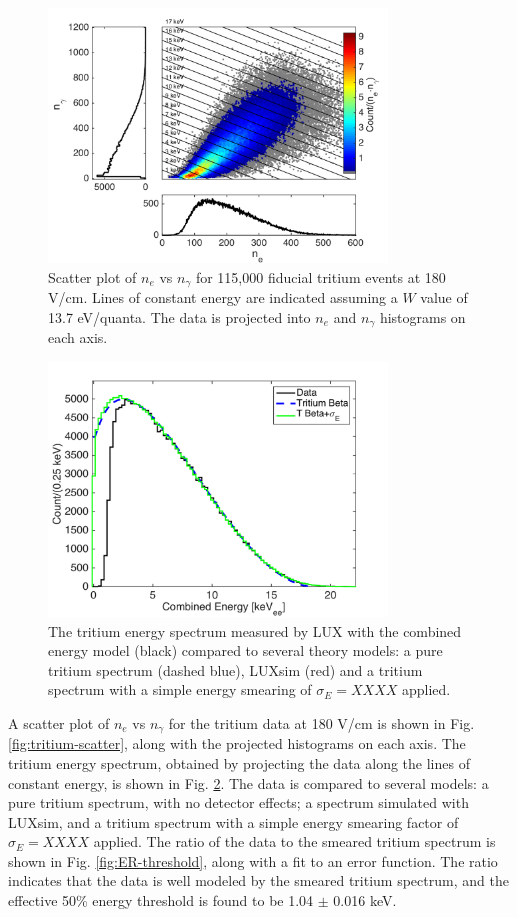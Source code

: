 \begin{figure}[h!]\centering
\includegraphics[width=90mm]{fig/tritium_scatter.png}
\caption{Scatter plot of $n_e$ vs $n_{\gamma}$ for 115,000 fiducial tritium events at 180 V/cm. Lines of constant energy are indicated assuming a $W$ value of 13.7 eV/quanta. The data is projected into $n_e$ and $n_{\gamma}$ histograms on each axis.}
\label{fig:tritium_scatter}
\end{figure}


\begin{figure}[h!]
\begin{center}
\includegraphics[width=90mm]{fig/tritium-spectrum-linear.png}
\caption{The tritium energy spectrum measured by LUX with the combined energy model (black) compared to several theory models: a pure tritium spectrum (dashed blue), LUXsim (red) and a tritium spectrum with a simple energy smearing of $\sigma_E = XXXX$ applied. }
\label{fig:tritium-spectrum}
\end{center}
\end{figure}



A scatter plot of $n_e$ vs $n_{\gamma}$ for the tritium data at 180 V/cm is shown in Fig. \ref{fig:tritium-scatter}, along with the projected histograms on each axis. The tritium energy spectrum, obtained by projecting the data along the lines of constant energy, is shown in Fig. \ref{fig:tritium-spectrum}. The data is compared to several models: a pure tritium spectrum, with no detector effects; a spectrum simulated with LUXsim, and a tritium spectrum with a simple energy smearing factor of $\sigma_E = XXXX$ applied. The ratio of the data to the smeared tritium spectrum is shown in Fig. \ref{fig:ER-threshold}, along with a fit to an error function. The ratio indicates that the data is well modeled by the smeared tritium spectrum, and the effective 50\% energy threshold is found to be 1.04 $\pm$ 0.016 keV. 

